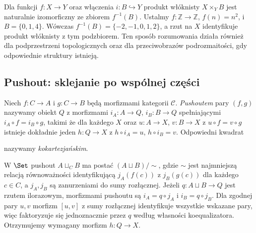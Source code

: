 \begin{przyklad}
Dla funkcji $f:X\to Y$ oraz włączenia $i:B\hookrightarrow Y$ produkt włóknisty $X\times_Y B$ jest naturalnie izomorficzny ze zbiorem $f^{-1}(B)$. Ustalmy $f:\mathbb Z\to\mathbb Z$, $f(n)=n^2$, i $B=\{0,1,4\}$. Wówczas $f^{-1}(B)=\{-2,-1,0,1,2\}$, a rzut na $X$ identyfikuje produkt włóknisty z tym podzbiorem. Ten sposób rozumowania działa również dla podprzestrzeni topologicznych oraz dla przeciwobrazów podrozmaitości, gdy odpowiednie struktury istnieją.
\end{przyklad}


\subsection{Pushout: sklejanie po wspólnej części}

\begin{definicja}[Pushout]\label{def:pushout}
Niech $f:C\to A$ i $g:C\to B$ będą morfizmami kategorii $\mathcal C$. \emph{Pushoutem} pary $(f,g)$ nazywamy obiekt $Q$ z morfizmami $i_A:A\to Q$, $i_B:B\to Q$ spełniającymi $i_A\circ f=i_B\circ g$, takimi że dla każdego $X$ oraz $u:A\to X$, $v:B\to X$ z $u\circ f=v\circ g$ istnieje dokładnie jeden $h:Q\to X$ z $h\circ i_A=u$, $h\circ i_B=v$. Odpowiedni kwadrat
\begin{center}
\end{center}
nazywamy \emph{kokartezjańskim}.
\end{definicja}

\begin{przyklad}
W $\Set$ pushout $A\sqcup_C B$ ma postać $(A\sqcup B)/{\sim}$, gdzie $\sim$ jest najmniejszą relacją równoważności identyfikującą $j_A(f(c))$ z $j_B(g(c))$ dla każdego $c\in C$, a $j_A,j_B$ są zanurzeniami do sumy rozłącznej. Jeżeli $q:A\sqcup B\to Q$ jest rzutem ilorazowym, morfizmami pushoutu są $i_A=q\circ j_A$ i $i_B=q\circ j_B$. Dla zgodnej pary $u,v$ morfizm $[u,v]$ z sumy rozłącznej identyfikuje wszystkie wskazane pary, więc faktoryzuje się jednoznacznie przez $q$ według własności koequalizatora. Otrzymujemy wymagany morfizm $h:Q\to X$.
\end{przyklad}


